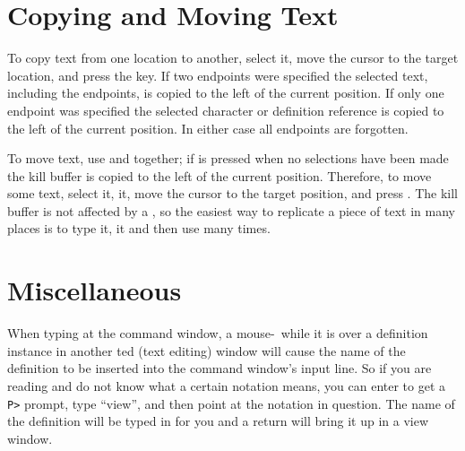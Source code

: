 \section{Copying and Moving Text}

To{} copy text from one location to another, select it,
move the cursor to the
target location, and press the \COPY{} key.
If two endpoints were specified the selected text, including the endpoints,
is copied to the left of the current position.
If only one endpoint was specified the selected character or definition reference is
copied to the left of the current position.
In either case all endpoints are forgotten.

To move{} text, use \KILL{} and \COPY{} together;
if \COPY{} is pressed when no selections have been made the
kill buffer is copied to the left of the current position.
Therefore, to move some text, select it, \KILL{} it, move the cursor
to the target position, and press \COPY.
The kill buffer is not affected by a \COPY,
so the easiest way to replicate a piece of text in many places is to
type it, \KILL{} it and then use \COPY{} many times.

\section{Miscellaneous}

When typing at the command window, a mouse-\SEL\ while it is over a
definition instance in another ted (text editing) window will cause the
name of the definition to be inserted into the command window's input line.
So if you are reading and do not know what a certain notation means, you
can enter \CMD{} to get a {\tt P>} prompt, type ``view'', and then point at
the notation in question.  The name of the definition will be typed in for
you and a return will bring it up in a view window.  






